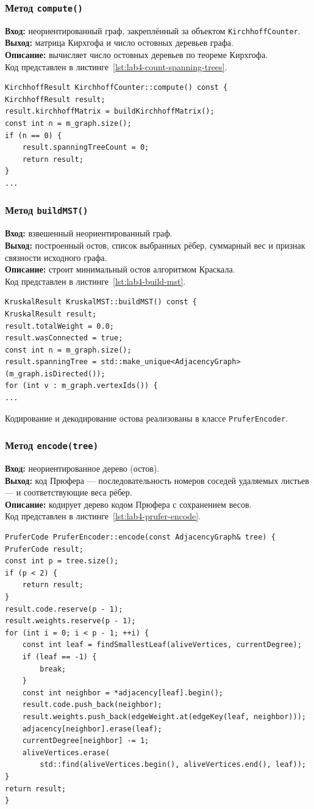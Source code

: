 \documentclass[14pt,a4paper]{extarticle}
\newcommand{\funcblock}[5]{%
\subsubsection*{Метод \code{#1}}
\noindent
\textbf{Вход:} #2\\
\textbf{Выход:} #3\\
\textbf{Описание:} #4\\
Код представлен в листинге~\ref{#5}.%
}
\newcommand{\code}[1]{\texttt{#1}}
\begin{document}
\funcblock
{compute()}
{неориентированный граф, закреплённый за объектом \code{KirchhoffCounter}.}
{матрица Кирхгофа и число остовных деревьев графа.}
{вычисляет число остовных деревьев по теореме Кирхгофа.}
{lst:lab4-count-spanning-trees}
\begin{lstlisting}[style=cppcode,caption={Фрагмент функции \code{compute()}},label={lst:lab4-count-spanning-trees}]
KirchhoffResult KirchhoffCounter::compute() const {
KirchhoffResult result;
result.kirchhoffMatrix = buildKirchhoffMatrix();
const int n = m_graph.size();
if (n == 0) {
    result.spanningTreeCount = 0;
    return result;
}
...
\end{lstlisting}

\funcblock
{buildMST()}
{взвешенный неориентированный граф.}
{построенный остов, список выбранных рёбер, суммарный вес и признак связности исходного графа.}
{строит минимальный остов алгоритмом Краскала.}
{lst:lab4-build-mst}
\begin{lstlisting}[style=cppcode,caption={Фрагмент функции \code{buildMST()}},label={lst:lab4-build-mst}]
KruskalResult KruskalMST::buildMST() const {
KruskalResult result;
result.totalWeight = 0.0;
result.wasConnected = true;
const int n = m_graph.size();
result.spanningTree = std::make_unique<AdjacencyGraph>(m_graph.isDirected());
for (int v : m_graph.vertexIds()) {
...
\end{lstlisting}

Кодирование и декодирование остова реализованы в классе \code{PruferEncoder}.

\funcblock
{encode(tree)}
{неориентированное дерево (остов).}
{код Прюфера --- последовательность номеров соседей удаляемых листьев --- и соответствующие веса рёбер.}
{кодирует дерево кодом Прюфера с сохранением весов.}
{lst:lab4-prufer-encode}
\begin{lstlisting}[style=cppcode,caption={Фрагмент функции \code{encode(tree)}},label={lst:lab4-prufer-encode}]
PruferCode PruferEncoder::encode(const AdjacencyGraph& tree) {
PruferCode result;
const int p = tree.size();
if (p < 2) {
    return result;
}
result.code.reserve(p - 1);
result.weights.reserve(p - 1);
for (int i = 0; i < p - 1; ++i) {
    const int leaf = findSmallestLeaf(aliveVertices, currentDegree);
    if (leaf == -1) {
        break;
    }
    const int neighbor = *adjacency[leaf].begin();
    result.code.push_back(neighbor);
    result.weights.push_back(edgeWeight.at(edgeKey(leaf, neighbor)));
    adjacency[neighbor].erase(leaf);
    currentDegree[neighbor] -= 1;
    aliveVertices.erase(
        std::find(aliveVertices.begin(), aliveVertices.end(), leaf));
}
return result;
}
\end{lstlisting}
\end{document}

